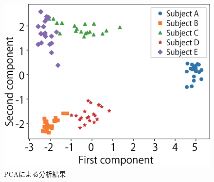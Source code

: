 \documentclass[a4j]{jarticle}%
\begin{document}
\begin{figure}[!t]
  \begin{center}
    \includegraphics[width=1\linewidth]{PCA.eps}
  \end{center}
    \vspace{-8mm}
  \caption{PCAによる分析結果}
  \label{pca}
\end{figure}

%
%

\end{document}
